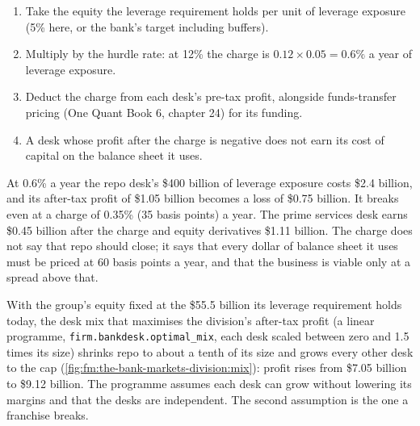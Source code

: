 \begin{method}\label{met:fm:the-bank-markets-division:charge}
\begin{enumerate}
\item Take the equity the leverage requirement holds per unit of leverage exposure (5\% here, or the bank's target including buffers).
\item Multiply by the hurdle rate: at 12\% the charge is $0.12\times0.05=0.6\%$ a year of leverage exposure.
\item Deduct the charge from each desk's pre-tax profit, alongside funds-transfer pricing (One Quant Book 6, chapter 24) for its funding.
\item A desk whose profit after the charge is negative does not earn its cost of capital on the balance sheet it uses.
\end{enumerate}
\end{method}

At 0.6\% a year the repo desk's \$400 billion of leverage exposure costs \$2.4 billion, and its after-tax profit of \$1.05 billion becomes a loss of
\$0.75 billion. It breaks even at a charge of 0.35\% (35 basis points) a year. The prime services desk earns \$0.45 billion after the charge and
equity derivatives \$1.11 billion. The charge does not say that repo should close; it says that every dollar of balance sheet it uses must be
priced at 60 basis points a year, and that the business is viable only at a spread above that.

\label{lst:fm:the-bank-markets-division:bankdesk}

With the group's equity fixed at the \$55.5 billion its leverage requirement holds today, the desk mix that maximises the division's after-tax
profit (a linear programme, \texttt{firm.bankdesk.optimal\_mix}, each desk scaled between zero and 1.5 times its size) shrinks repo to about a
tenth of its size and grows every other desk to the cap (\cref{fig:fm:the-bank-markets-division:mix}): profit rises from \$7.05 billion to \$9.12
billion. The programme assumes each desk can grow without lowering its margins and that the desks are independent. The second assumption is the
one a franchise breaks.

